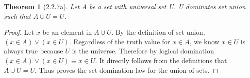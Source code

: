 \documentclass[a4paper, 12pt]{article}
\theoremstyle{plain}
\newtheorem*{theorem*}{Theorem}
\begin{document}
	
	\begin{theorem*}[2.2.7a]
		Let A be a set with universal set U. U dominates set union such that $A \cup U = U$.
	\end{theorem*}
	
	\begin{proof}
		Let $x$ be an element in $A \cup U$. By the definition of set union, \newline $(x \in A) \lor (x \in U)$. Regardless of the truth value for $x \in A$, we know $x \in U$ is always true because $U$ is the universe. Therefore by logical domination $(x \in A) \lor (x \in U) \equiv x \in U$. It directly follows from the definitions that $A \cup U = U$. Thus proves the set domination law for the union of sets.
	\end{proof}
\end{document}
